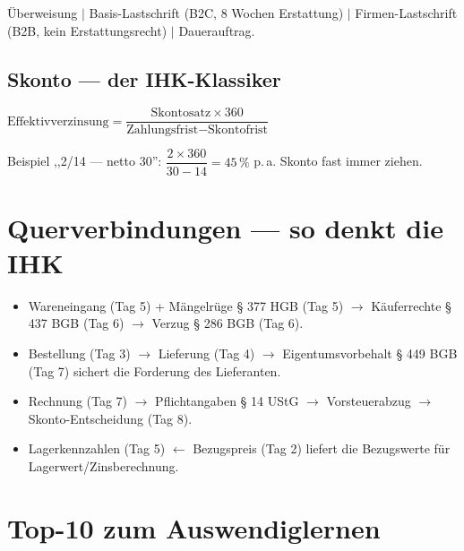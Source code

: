 \documentclass[11pt, a4paper]{article}
\begin{document}
Überweisung $|$ Basis-Lastschrift (B2C, 8 Wochen Erstattung) $|$ Firmen-Lastschrift
(B2B, kein Erstattungsrecht) $|$ Dauerauftrag.

\subsection{Skonto --- der IHK-Klassiker}

\begin{merksatz}[title={Effektivverzinsung der Skonto-Inanspruchnahme}]
$\text{Effektivverzinsung} = \dfrac{\text{Skontosatz} \times 360}{\text{Zahlungsfrist} - \text{Skontofrist}}$
\end{merksatz}

Beispiel ,,2/14 --- netto 30'': $\dfrac{2 \times 360}{30 - 14} = 45\,\%$ p.\,a.
Skonto fast immer ziehen.

\section{Querverbindungen --- so denkt die IHK}

\begin{itemize}[itemsep=2pt]
  \item Wareneingang (Tag 5) + Mängelrüge § 377 HGB (Tag 5) $\to$ Käuferrechte § 437 BGB (Tag 6) $\to$ Verzug § 286 BGB (Tag 6).
  \item Bestellung (Tag 3) $\to$ Lieferung (Tag 4) $\to$ Eigentumsvorbehalt § 449 BGB (Tag 7) sichert die Forderung des Lieferanten.
  \item Rechnung (Tag 7) $\to$ Pflichtangaben § 14 UStG $\to$ Vorsteuerabzug $\to$ Skonto-Entscheidung (Tag 8).
  \item Lagerkennzahlen (Tag 5) $\leftarrow$ Bezugspreis (Tag 2) liefert die Bezugswerte für Lagerwert/Zinsberechnung.
\end{itemize}

\section{Top-10 zum Auswendiglernen}
\end{document}
